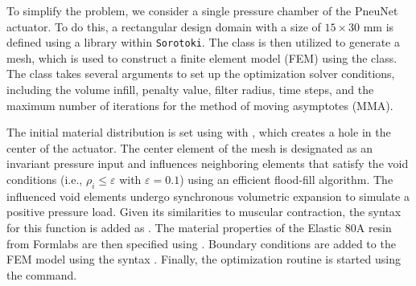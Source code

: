 To simplify the problem, we consider a single pressure chamber of the PneuNet actuator. To do this, a rectangular design domain with a size of $15 \times 30$ \si{\milli \meter} is defined using a  library within \texttt{Sorotoki}. The  class is then utilized to generate a mesh, which is used to construct a finite element model (FEM) using the  class. The  class takes several arguments to set up the optimization solver conditions, including the volume infill, penalty value, filter radius, time steps, and the maximum number of iterations for the method of moving asymptotes (MMA).

%
%
The initial material distribution is set using  with , which creates a hole in the center of the actuator. The center element of the mesh is designated as an invariant pressure input and influences neighboring elements that satisfy the void conditions (i.e., $\rho_i \le \varepsilon$ with $\varepsilon = 0.1$) using an efficient flood-fill algorithm. The influenced void elements undergo synchronous volumetric expansion to simulate a positive pressure load. Given its similarities to muscular contraction, the syntax for this function is added as . The material properties of the Elastic 80A resin from Formlabs are then specified using . Boundary conditions are added to the FEM model using the syntax . Finally, the optimization routine is started using the  command. %





